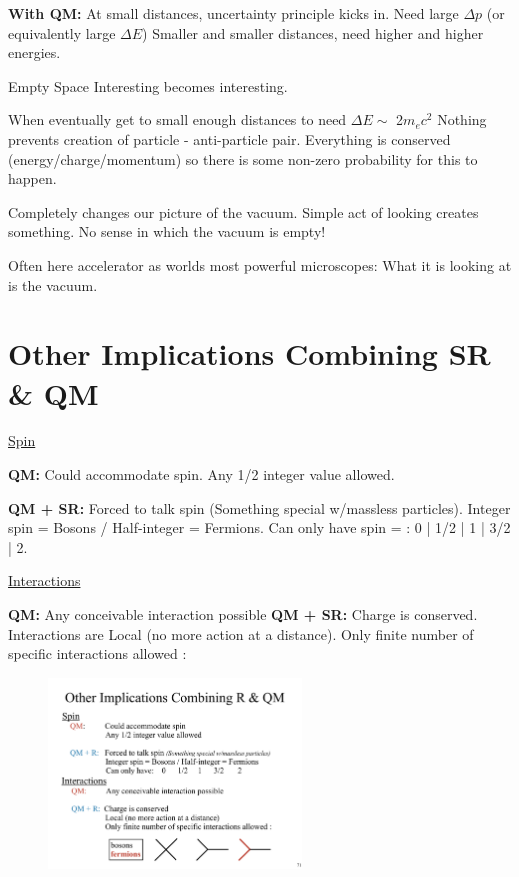 \textbf{With QM:}
At small distances, uncertainty principle kicks in.
Need large $\Delta p$ (or equivalently large $\Delta E$)
Smaller and smaller distances, need higher and higher energies.

Empty Space Interesting becomes interesting.

When eventually get to small enough distances to need $\Delta E \sim$  2$m_e c^2$
Nothing prevents creation of particle - anti-particle pair.
Everything is conserved (energy/charge/momentum) so there is some non-zero probability for this to happen.

Completely changes our picture of the vacuum.
Simple act of looking creates something.
No sense in which the vacuum is empty!

Often here accelerator as worlds most powerful microscopes:
What it is looking at is the vacuum.

\section{Other Implications Combining SR \& QM}

\underline{Spin}

\textbf{QM:}
Could accommodate spin. 
Any 1/2 integer value allowed.

\textbf{ QM + SR:}
Forced to talk spin (Something special w/massless particles).
Integer spin = Bosons / Half-integer = Fermions.
Can only have spin = : 0 | 1/2 | 1 | 3/2 | 2.

\underline{Interactions}

\textbf{QM:} Any conceivable interaction possible
\textbf{QM + SR:} Charge is conserved. 
Interactions are Local (no more action at a distance).
Only finite number of specific interactions allowed :
\begin{figure}[h]
\centering
\includegraphics[width=0.6\textwidth]{./AllowedInteractions.pdf}
\end{figure}

